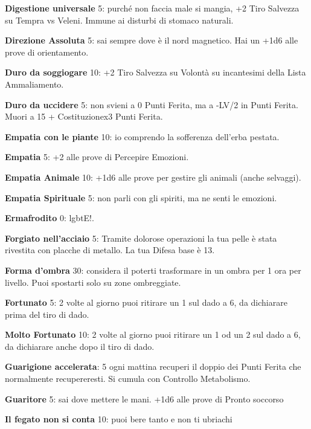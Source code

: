 \documentclass[a4paper,twoside,openany]{book}
\begin{document}
\begin{multicols}{2}
\textbf{Digestione universale} 5: purché non faccia male si mangia, +2 Tiro Salvezza su Tempra vs Veleni. Immune ai disturbi di stomaco naturali.

\textbf{Direzione Assoluta} 5: sai sempre dove è il nord magnetico. Hai un +1d6 alle prove di orientamento.

\textbf{Duro da soggiogare} 10: +2 Tiro Salvezza su Volontà su incantesimi della Lista Ammaliamento.

\textbf{Duro da uccidere} 5: non svieni a 0 Punti Ferita, ma a -LV/2 in Punti Ferita. Muori a 15 + Costituzionex3 Punti Ferita.

\textbf{Empatia con le piante} 10: io comprendo la sofferenza dell'erba pestata.

\textbf{Empatia} 5: +2 alle prove di Percepire Emozioni.

\textbf{Empatia Animale} 10: +1d6 alle prove per gestire gli animali (anche selvaggi).

\textbf{Empatia Spirituale} 5: non parli con gli spiriti, ma ne senti le emozioni.

\textbf{Ermafrodito} 0: lgbtE!.

\textbf{Forgiato nell'acciaio} 5: Tramite dolorose operazioni la tua pelle è stata rivestita con placche di metallo. La tua Difesa base è 13.

\textbf{Forma d'ombra} 30: considera il poterti trasformare in un ombra per 1 ora per livello. Puoi spostarti solo su zone ombreggiate.

\textbf{Fortunato} 5: 2 volte al giorno puoi ritirare un 1 sul dado a 6, da dichiarare prima del tiro di dado.

\textbf{Molto Fortunato}  10: 2 volte al giorno puoi ritirare un 1 od un 2 sul dado a 6, da dichiarare anche dopo il tiro di dado.

\textbf{Guarigione accelerata}: 5 ogni mattina recuperi il doppio dei Punti Ferita che normalmente recupereresti. Si cumula con Controllo Metabolismo. 

\textbf{Guaritore} 5: sai dove mettere le mani. +1d6 alle prove di Pronto soccorso

\textbf{Il fegato non si conta} 10: puoi bere tanto e non ti ubriachi


\end{multicols}
\end{document}
